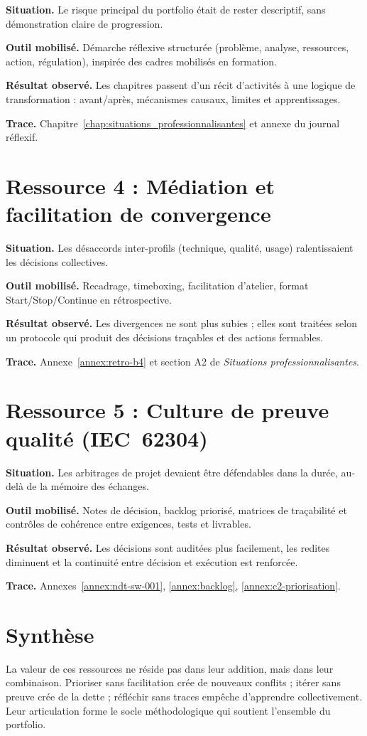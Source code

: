 \textbf{Situation.} Le risque principal du portfolio était de rester descriptif, sans démonstration claire de progression.

\textbf{Outil mobilisé.} Démarche réflexive structurée (problème, analyse, ressources, action, régulation), inspirée des cadres mobilisés en formation.

\textbf{Résultat observé.} Les chapitres passent d'un récit d'activités à une logique de transformation : avant/après, mécanismes causaux, limites et apprentissages.

\textbf{Trace.} Chapitre~\ref{chap:situations_professionnalisantes} et annexe du journal réflexif.

\section{Ressource 4 : Médiation et facilitation de convergence}

\textbf{Situation.} Les désaccords inter-profils (technique, qualité, usage) ralentissaient les décisions collectives.

\textbf{Outil mobilisé.} Recadrage, timeboxing, facilitation d'atelier, format Start/Stop/Continue en rétrospective.

\textbf{Résultat observé.} Les divergences ne sont plus subies ; elles sont traitées selon un protocole qui produit des décisions traçables et des actions fermables.

\textbf{Trace.} Annexe~\ref{annex:retro-b4} et section A2 de \textit{Situations professionnalisantes}.

\section{Ressource 5 : Culture de preuve qualité (IEC~62304)}

\textbf{Situation.} Les arbitrages de projet devaient être défendables dans la durée, au-delà de la mémoire des échanges.

\textbf{Outil mobilisé.} Notes de décision, backlog priorisé, matrices de traçabilité et contrôles de cohérence entre exigences, tests et livrables.

\textbf{Résultat observé.} Les décisions sont auditées plus facilement, les redites diminuent et la continuité entre décision et exécution est renforcée.

\textbf{Trace.} Annexes~\ref{annex:ndt-sw-001}, \ref{annex:backlog}, \ref{annex:c2-priorisation}.

\section{Synthèse}

La valeur de ces ressources ne réside pas dans leur addition, mais dans leur combinaison. Prioriser sans facilitation crée de nouveaux conflits ; itérer sans preuve crée de la dette ; réfléchir sans traces empêche d'apprendre collectivement. Leur articulation forme le socle méthodologique qui soutient l'ensemble du portfolio.
